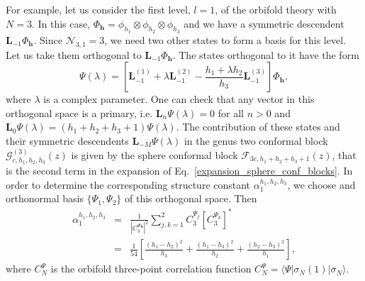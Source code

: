 \documentclass[a4paper,11pt]{article}
\begin{document}
For example, let us consider the first level, $l=1$, of the orbifold theory 
with $N=3$. In this case, $\Phi_{\boldsymbol{h}}=\phi_{h_1}\otimes\phi_{h_2}\otimes\phi_{h_3}$ 
and we have a symmetric descendent $\boldsymbol{L}_{-1}\Phi_{\boldsymbol{h}}$. Since $\mathcal{N}_{3,1}=3$, 
we need two other states to form a basis for this level. Let us take them 
orthogonal to $\boldsymbol{L}_{-1}\Phi_{\boldsymbol{h}}$. The states orthogonal to it have the form
\begin{equation}
 \Psi(\lambda)=\left[\boldsymbol{L}_{-1}^{(1)}+\lambda \boldsymbol{L}_{-1}^{(2)}
 -\frac{h_1+\lambda h_2}{h_3} \boldsymbol{L}_{-1}^{(3)}\right]\Phi_{\boldsymbol{h}},
\end{equation}
where $\lambda$ is a complex parameter. One can check
that any vector in this orthogonal space is a primary, 
i.e. $\boldsymbol{L}_n \Psi(\lambda)=0$ for all $n>0$
and $\boldsymbol{L}_0\Psi(\lambda) = (h_1+h_2+h_3+1)\Psi(\lambda)$.
The contribution of these states and their symmetric descendents $\boldsymbol{L}_{-M}\Psi(\lambda)$
in the genus two conformal block $\mathcal{G}_{c, h_1, h_2, h_3}^{(3)}(z)$
is given by the sphere conformal block $\mathcal{F}_{3c, h_1+h_2+h_3+1}(z)$,
that is the second term in the expansion of Eq.~\eqref{expansion_sphere_conf_blocks}. In order to 
determine the corresponding structure constant $\alpha_{1}^{h_1, h_2, h_3}$, 
we choose and orthonormal basis $\{\Psi_1, \Psi_2\}$ of 
this orthogonal space. Then
\begin{eqnarray}
 \alpha_1^{h_1, h_2, h_3}&=&\frac{1}{|C_3^{\Phi_{\boldsymbol{h}}}|^2}\sum_{j, k=1}^2
 C_3^{\Psi_j}\left[C_3^{\Psi_k}\right]^*\\
 &=& \frac{1}{54}\left[\frac{(h_1-h_2)^2}{h_3}+\frac{(h_1-h_3)^2}{h_2}+\frac{(h_2-h_3)^2}{h_1}\right],
\end{eqnarray}
where $C_{N}^\Psi$ is the orbifold three-point correlation function $C_{N}^\Psi=\langle \Psi|\sigma_N(1)|\bar{\sigma}_N\rangle$.
\end{document}
